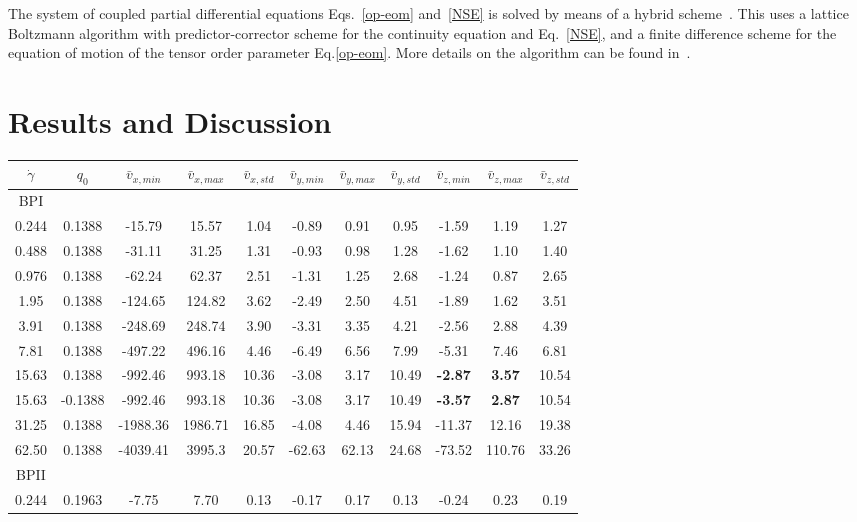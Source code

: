 \documentclass[aps,pre,reprint,superscriptaddress, twocolumn]{revtex4}
\begin{document}
The system of coupled partial differential equations Eqs.~\ref{op-eom}
and~\ref{NSE} is solved by means of a
hybrid scheme~\cite{Marenduzzo:2007}. This uses a lattice Boltzmann algorithm
with predictor-corrector scheme for the continuity equation and
Eq.~\ref{NSE}, and a finite difference scheme for the equation of motion of
the tensor order parameter Eq.\ref{op-eom}. More details on the algorithm can
be found in~\cite{Denniston:2001, Denniston:2004}.


\section{Results and Discussion}

\begin{table}[htpb]
\begin{tabular}{|c|| c || c |c |c||c| c| c||c| c| c|}
\hline
$\dot{\gamma}$ & $q_0$ & $\bar{v}_{x,min}$ & $\bar{v}_{x,max}$ & $\bar{v}_{x,std}$ & $\bar{v}_{y,min}$ & $\bar{v}_{y,max}$ & $\bar{v}_{y,std}$ & $\bar{v}_{z,min}$ & $\bar{v}_{z,max}$ & $\bar{v}_{z,std}$ \\
\hline
BPI \\
\hline
0.244 & 0.1388 &-15.79 &15.57 &1.04 &-0.89 &0.91 &0.95 &-1.59 &1.19 &1.27 \\
0.488 &0.1388 &-31.11 &31.25 &1.31 &-0.93 &0.98 &1.28 &-1.62 &1.10 &1.40 \\
0.976 &0.1388 &-62.24 &62.37 &2.51 &-1.31 &1.25 &2.68 &-1.24 &0.87 &2.65 \\
1.95 & 0.1388 &-124.65 &124.82 &3.62&  -2.49 &2.50 &4.51 &-1.89 & 1.62 &3.51 \\
3.91 &0.1388 &-248.69 &248.74 &3.90&  -3.31 &3.35 &4.21 &-2.56 & 2.88 &4.39 \\
7.81 &0.1388 &-497.22 &496.16 &4.46 &-6.49 &6.56 &7.99 &-5.31 & 7.46 &6.81 \\ 
15.63 &0.1388 &-992.46 &993.18 &10.36 &-3.08 &3.17 &10.49 &\bf{-2.87} & \bf{3.57} &10.54 \\
15.63 &-0.1388 &-992.46 &993.18 &10.36 &-3.08 &3.17 &10.49 &\bf{-3.57} & \bf{2.87} &10.54 \\
31.25 &0.1388 & -1988.36 &1986.71 &16.85 &-4.08 &4.46 &15.94 &-11.37 & 12.16 &19.38\\
62.50 &0.1388 & -4039.41 &3995.3  & 20.57 & -62.63 & 62.13 & 24.68 &-73.52 & 110.76 & 33.26 \\
\hline
BPII \\
\hline
0.244 &0.1963 &-7.75 &7.70 &0.13 &-0.17 &0.17 &0.13 &-0.24 &0.23 &0.19 \\

\end{tabular}
\end{table}
\end{document}
